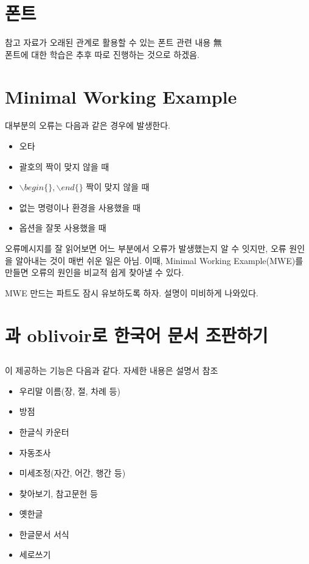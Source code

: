 \documentclass{article}
\begin{document}
\section{폰트}
참고 자료가 오래된 관계로 활용할 수 있는 폰트 관련 내용 無
\\ 폰트에 대한 학습은 추후 따로 진행하는 것으로 하겠음. 

\section{Minimal Working Example}
대부분의 오류는 다음과 같은 경우에 발생한다. 
\begin{itemize}
\item 오타
\item 괄호의 짝이 맞지 않을 때
\item $\backslash begin\{\}, \backslash end\{\}$ 짝이 맞지 않을 때
\item 없는 명령이나 환경을 사용했을 때
\item 옵션을 잘못 사용했을 때
\end{itemize}

오류메시지를 잘 읽어보면 어느 부분에서 오류가 발생했는지 알 수 잇지만, 오류 원인을 알아내는 것이 매번 쉬운 일은 아님.
이때, Minimal Working Example(MWE)를 만들면 오류의 원인을 비교적 쉽게 찾아낼 수 있다. 
\begin{footnotesize}
MWE 만드는 파트도 잠시 유보하도록 하자. 설명이 미비하게 나와있다. 
\end{footnotesize}

\section{\koTeX{}과 oblivoir로 한국어 문서 조판하기}
\subsection{\koTeX}
\koTeX{}이 제공하는 기능은 다음과 같다. 자세한 내용은 \koTeX 설명서 참조
\begin{itemize}
    \item 우리말 이름(장, 절, 차례 등)
    \item 방점
    \item 한글식 카운터
    \item 자동조사
    \item 미세조정(자간, 어간, 행간 등)
    \item 찾아보기, 참고문헌 등
    \item 옛한글
    \item 한글문서 서식
    \item 세로쓰기
\end{itemize}
\end{document}
